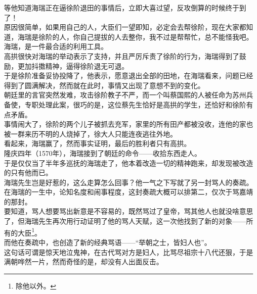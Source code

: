 \begin{multicols}{\theparacolNo}
等他知道海瑞正在逼徐阶退田的事情后，立即大喜过望，反攻倒算的时候终于到了！\\

原因很简单，如果用自己的人，大臣们一望即知，必定会去帮徐阶，现在大家都知道，海瑞是徐阶的人，你自己提拔的人去整你，我不过是帮帮忙，总不能怪我吧。\\

海瑞，是一件最合适的利用工具。\\

高拱很快对海瑞的举动表示了支持，并且严厉斥责了徐阶的行为，海瑞得到了鼓励，更加抖擞精神，逼得徐阶退无可退。\\

于是徐阶准备妥协投降了，他表示，愿意退出全部的田地，在海瑞看来，问题已经得到了圆满解决，然而就在此时，事情又出现了意想不到的变化。\\

朝廷里的言官突然发难，攻击徐阶教子不严，而一个叫蔡国熙的人被任命为苏州兵备使，专职处理此案，很巧的是，这位蔡先生恰好是高拱的学生，还恰好和徐阶有点矛盾。\\

事情闹大了，徐阶的两个儿子被抓去充军，家里的所有田产都被没收，连他的家也被一群来历不明的人烧掉了，徐大人只能连夜逃往外地。\\

看起来，海瑞赢了，然而事实证明，最后的胜利者只有高拱。\\

隆庆四年（1570年），海瑞接到了朝廷的命令——收拾东西走人。\\

于是仅仅当了半年多巡抚的海瑞走了，他本着改造一切的精神跑来，却发现被改造的只有他而已。\\

海瑞先生岂是好惹的，这么走算怎么回事？他一气之下写就了另一封骂人的奏疏。\\

在海瑞的一生中，论知名度和闹事程度，这封奏疏大概可以排第二，仅次于骂嘉靖的那封。\\

要知道，骂人想要骂出新意是不容易的，既然骂过了皇帝，骂其他人也就没啥意思了，但海瑞先生再次用行动证明了他的骂人天赋，这一次他找到了新的对象——所有的大臣\footnote{除他以外。}。\\

而他在奏疏中，也创造了新的经典骂语——“举朝之士，皆妇人也”。\\

这句话可谓是惊天地泣鬼神，在古代骂对方是妇人，比骂尽祖宗十八代还狠，于是满朝哗然一片，然而奇怪的是，却没有人出面反击。\\


\end{multicols}
